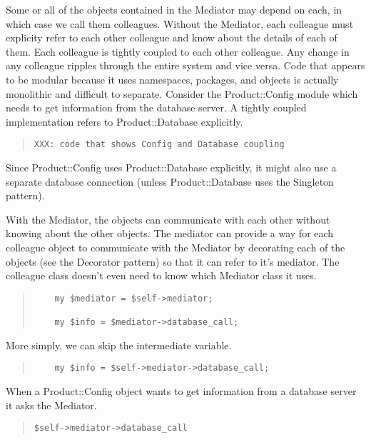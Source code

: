 Some or all of the objects contained in the Mediator may depend on
each, in which case we call them colleagues.  Without the Mediator,
each colleague must explicity refer to each other colleague and know
about the details of each of them.  Each colleague is tightly coupled
to each other colleague.  Any change in any colleague ripples through
the entire system and vice versa.  Code that appears to be modular because
it uses namespaces, packages, and objects is actually monolithic and
difficult to separate. Consider the Product::Config module which needs
to get information from the database server.  A tightly coupled implementation 
refers to Product::Database explicitly.

\begin{quote}    
\begin{verbatim}
XXX: code that shows Config and Database coupling
\end{verbatim}
\end{quote}    

Since Product::Config uses Product::Database explicitly, it might
also use a separate database connection (unless Product::Database uses
the Singleton pattern).

With the Mediator, the objects can communicate with each other without
knowing about the other objects.  The mediator can provide a way for
each colleague object to communicate with the Mediator by decorating
each of the objects (see the Decorator pattern) so that it can refer to
it's mediator.  The colleague class doesn't even need to know which
Mediator class it uses.

\begin{quote}    
\begin{verbatim}
	my $mediator = $self->mediator;
	
	my $info = $mediator->database_call;
\end{verbatim}
\end{quote}    

More simply, we can skip the intermediate variable.

\begin{quote}    
\begin{verbatim}
	my $info = $self->mediator->database_call;
\end{verbatim}
\end{quote}    



When a Product::Config
object wants to get information from a database server it asks the Mediator.

\begin{quote}    
\begin{verbatim}
$self->mediator->database_call
\end{verbatim}
\end{quote}    

